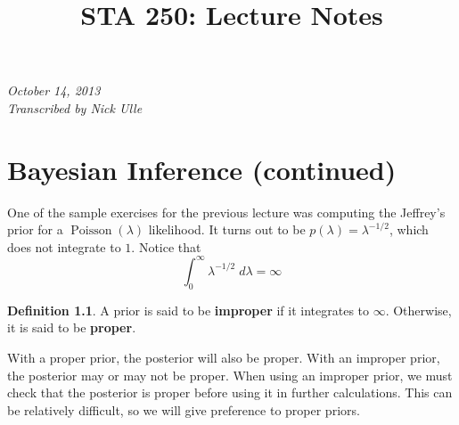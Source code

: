 \documentclass[article]{memoir}
\title{STA 250: Lecture Notes}
\DeclareMathOperator{\1}{\mathbf{1}}
\newcommand{\dist}[1]{\operatorname{#1}}
\theoremstyle{definition}
\newtheorem{defi}{Definition}[chapter]
\begin{document}
    \begin{center}
    \textsl{October 14, 2013} \\
    \textsl{Transcribed by Nick Ulle}
    \end{center}
\chapter{Bayesian Inference (continued)}
One of the sample exercises for the previous lecture was computing the
Jeffrey's prior for a $\dist{Poisson}(\lambda)$ likelihood. It turns out to
be $p(\lambda) = \lambda^{-1/2}$, which does not integrate to $1$. Notice
that
    \[
    \int_0^\infty \lambda^{-1/2} \;d\lambda = \infty
    \]
    \begin{defi}
    A prior is said to be \textbf{improper} if it integrates
    to $\infty$. Otherwise, it is said to be \textbf{proper}.
    \end{defi}
With a proper prior, the posterior will also be proper. With an improper
prior, the posterior may or may not be proper. When using an improper
prior, we must check that the posterior is proper before using it in further
calculations. This can be relatively difficult, so we will give preference
to proper priors.
\end{document}
